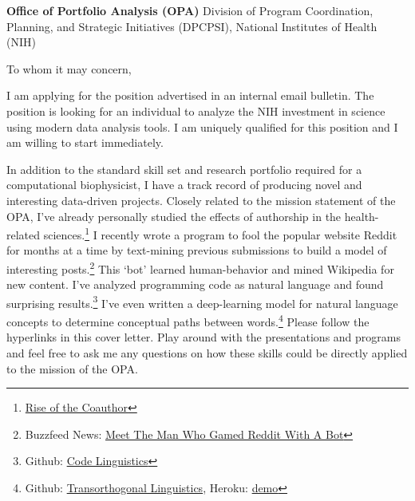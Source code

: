 \documentclass[]{scrartcl}
\begin{document}
\begin{cleanCV}

  \vspace{2em}
  \begin{raggedright}
    \textbf{Office of Portfolio Analysis (OPA)} \newline
    \hangindent=0.7cm \indent Division of Program Coordination, Planning,
    and {Strategic Initiatives} (DPCPSI),
    National Institutes of Health (NIH)
  \end{raggedright}
  
  \vspace{2em}

  To whom it may concern,

  \vspace{1em}
  \setlength{\parskip}{1em}
  
  I am applying for the position advertised in an internal email bulletin.
  The position is looking for an individual to analyze the NIH investment in science using modern data analysis tools.
  I am uniquely qualified for this position and I am willing to start immediately.

  In addition to the standard skill set and research portfolio required for a computational biophysicist, I have a track record of producing novel and interesting data-driven projects.
  Closely related to the mission statement of the OPA, I've already personally studied the effects of authorship in the health-related sciences.\footnote{
    \href{http://thoppe.github.io/Presentation_Rise_of_the_Coauthor}{Rise of the Coauthor}
  }
  I recently wrote a program to fool the popular website Reddit for months at a time by text-mining previous submissions to build a model of interesting posts.\footnote{
    Buzzfeed News: \href{http://www.buzzfeed.com/hamzashaban/today-ai-learned}{Meet The Man Who Gamed Reddit With A Bot}
  }
  This `bot' learned human-behavior and mined Wikipedia for new content.
  I've analyzed programming code as natural language and found surprising results.\footnote{
    Github: \href{http://thoppe.github.io/code-linguistics/HnC_presentation.html}{Code Linguistics}
  }
  I've even written a deep-learning model for natural language concepts to determine conceptual paths between words.\footnote{
    Github: \href{https://github.com/thoppe/transorthogonal-linguistics}{Transorthogonal Linguistics}, Heroku: \href{http://transorthogonal-linguistics.herokuapp.com/TOL/boy/man}{demo}
  }
  Please follow the hyperlinks in this cover letter.
  Play around with the presentations and programs and feel free to ask me any questions on how these skills could be directly applied to the mission of the OPA.


\end{cleanCV}
\end{document}
